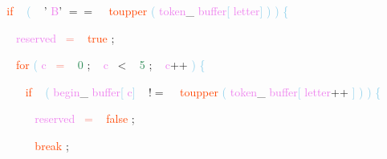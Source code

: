 \documentclass[8, usernames, dvipsnames]{beamer}
\begin{document}
\begin{frame}
\textcolor{White}{\   }
\textcolor{White}{\   }
\textcolor{OrangeRed}{if}
\textcolor{White}{\ }
\textcolor{SkyBlue}{(}
\textcolor{White}{\ }
\textcolor{BurntOrange}{'}
\textcolor{Violet}{B}\textcolor{BurntOrange}{'}
\textcolor{OliveGreen}{$==$}
\textcolor{White}{\ }
\textcolor{OrangeRed}{toupper}
\textcolor{SkyBlue}{(}
\textcolor{Violet}{token}\textcolor{Sepia}{\_}
\textcolor{Violet}{buffer}\textcolor{SkyBlue}{[}
\textcolor{Violet}{letter}\textcolor{SkyBlue}{]}
\textcolor{SkyBlue}{)}
\textcolor{SkyBlue}{)}
\textcolor{SkyBlue}{\{ }

 \textcolor{White}{\   }
\textcolor{White}{\   }
\textcolor{White}{\   }
\textcolor{Violet}{reserved}\textcolor{White}{\ }
\textcolor{Salmon}{=}
\textcolor{White}{\ }
\textcolor{OrangeRed}{true}
\textcolor{Sepia}{;}

 \textcolor{White}{\   }
\textcolor{White}{\   }
\textcolor{White}{\   }
\textcolor{OrangeRed}{for}
\textcolor{SkyBlue}{(}
\textcolor{Violet}{c}\textcolor{White}{\ }
\textcolor{Salmon}{=}
\textcolor{White}{\ }
\textcolor{SeaGreen}{0}
\textcolor{Sepia}{;}
\textcolor{White}{\ }
\textcolor{Violet}{c}\textcolor{White}{\ }
\textcolor{OliveGreen}{\textless}
\textcolor{White}{\ }
\textcolor{SeaGreen}{5}
\textcolor{Sepia}{;}
\textcolor{White}{\ }
\textcolor{Violet}{c}\textcolor{Apricot}{++}
\textcolor{SkyBlue}{)}
\textcolor{SkyBlue}{\{ }

 \textcolor{White}{\   }
\textcolor{White}{\   }
\textcolor{White}{\   }
\textcolor{White}{\   }
\textcolor{OrangeRed}{if}
\textcolor{White}{\ }
\textcolor{SkyBlue}{(}
\textcolor{Violet}{begin}\textcolor{Sepia}{\_}
\textcolor{Violet}{buffer}\textcolor{SkyBlue}{[}
\textcolor{Violet}{c}\textcolor{SkyBlue}{]}
\textcolor{White}{\ }
\textcolor{OliveGreen}{$!=$}
\textcolor{White}{\ }
\textcolor{OrangeRed}{toupper}
\textcolor{SkyBlue}{(}
\textcolor{Violet}{token}\textcolor{Sepia}{\_}
\textcolor{Violet}{buffer}\textcolor{SkyBlue}{[}
\textcolor{Violet}{letter}\textcolor{Apricot}{++}
\textcolor{SkyBlue}{]}
\textcolor{SkyBlue}{)}
\textcolor{SkyBlue}{)}
\textcolor{SkyBlue}{\{ }

 \textcolor{White}{\   }
\textcolor{White}{\   }
\textcolor{White}{\   }
\textcolor{White}{\   }
\textcolor{White}{\   }
\textcolor{Violet}{reserved}\textcolor{White}{\ }
\textcolor{Salmon}{=}
\textcolor{White}{\ }
\textcolor{OrangeRed}{false}
\textcolor{Sepia}{;}

 \textcolor{White}{\   }
\textcolor{White}{\   }
\textcolor{White}{\   }
\textcolor{White}{\   }
\textcolor{White}{\   }
\textcolor{OrangeRed}{break}
\textcolor{Sepia}{;}


\end{frame}
\end{document}
